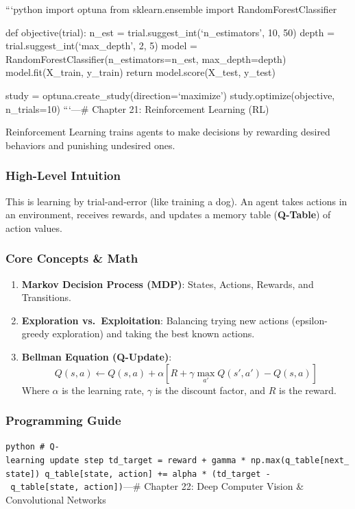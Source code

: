 ```python import optuna from sklearn.ensemble import
RandomForestClassifier

def objective(trial): n\_est = trial.suggest\_int(`n\_estimators', 10,
50) depth = trial.suggest\_int(`max\_depth', 2, 5) model =
RandomForestClassifier(n\_estimators=n\_est, max\_depth=depth)
model.fit(X\_train, y\_train) return model.score(X\_test, y\_test)

study = optuna.create\_study(direction=`maximize')
study.optimize(objective, n\_trials=10) ```\n\n---\n\n\# Chapter 21:
Reinforcement Learning (RL)

Reinforcement Learning trains agents to make decisions by rewarding
desired behaviors and punishing undesired ones.

\subsubsection{High-Level Intuition}\label{high-level-intuition-20}

This is learning by trial-and-error (like training a dog). An agent
takes actions in an environment, receives rewards, and updates a memory
table (\textbf{Q-Table}) of action values.

\subsubsection{Core Concepts \& Math}\label{core-concepts-math-3}

\begin{enumerate}
\def\labelenumi{\arabic{enumi}.}
\tightlist
\item
  \textbf{Markov Decision Process (MDP)}: States, Actions, Rewards, and
  Transitions.
\item
  \textbf{Exploration vs.~Exploitation}: Balancing trying new actions
  (epsilon-greedy exploration) and taking the best known actions.
\item
  \textbf{Bellman Equation (Q-Update)}:
  \[Q(s, a) \leftarrow Q(s, a) + \alpha \left[ R + \gamma \max_{a'} Q(s', a') - Q(s, a) \right]\]
  Where \(\alpha\) is the learning rate, \(\gamma\) is the discount
  factor, and \(R\) is the reward.
\end{enumerate}

\subsubsection{Programming Guide}\label{programming-guide-20}

\texttt{python\ \#\ Q-learning\ update\ step\ td\_target\ =\ reward\ +\ gamma\ *\ np.max(q\_table{[}next\_state{]})\ q\_table{[}state,\ action{]}\ +=\ alpha\ *\ (td\_target\ -\ q\_table{[}state,\ action{]})}\n\n---\n\n\#
Chapter 22: Deep Computer Vision \& Convolutional Networks

